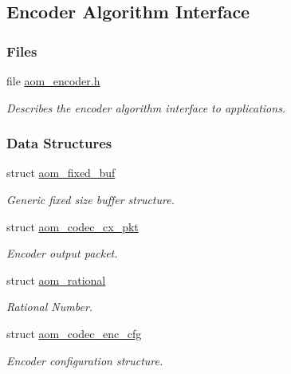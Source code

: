 \hypertarget{group__encoder}{}\subsection{Encoder Algorithm Interface}
\label{group__encoder}
\subsubsection*{Files}
\begin{DoxyCompactItemize}
\item 
file \hyperlink{aom__encoder_8h}{aom\+\_\+encoder.\+h}
\begin{DoxyCompactList}\small\item\em Describes the encoder algorithm interface to applications. \end{DoxyCompactList}\end{DoxyCompactItemize}
\subsubsection*{Data Structures}
\begin{DoxyCompactItemize}
\item 
struct \hyperlink{structaom__fixed__buf}{aom\+\_\+fixed\+\_\+buf}
\begin{DoxyCompactList}\small\item\em Generic fixed size buffer structure. \end{DoxyCompactList}\item 
struct \hyperlink{structaom__codec__cx__pkt}{aom\+\_\+codec\+\_\+cx\+\_\+pkt}
\begin{DoxyCompactList}\small\item\em Encoder output packet. \end{DoxyCompactList}\item 
struct \hyperlink{structaom__rational}{aom\+\_\+rational}
\begin{DoxyCompactList}\small\item\em Rational Number. \end{DoxyCompactList}\item 
struct \hyperlink{structaom__codec__enc__cfg}{aom\+\_\+codec\+\_\+enc\+\_\+cfg}
\begin{DoxyCompactList}\small\item\em Encoder configuration structure. \end{DoxyCompactList}\end{DoxyCompactItemize}
